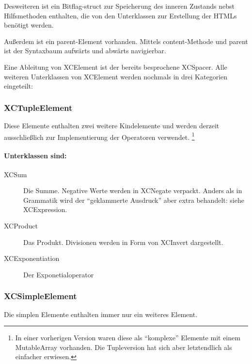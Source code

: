 Desweiteren ist ein Bitflag-struct zur Speicherung des inneren Zustands nebst Hilfsmethoden enthalten, die von den Unterklassen zur Erstellung der HTMLs benötigt werden.


Außerdem ist ein parent-Element vorhanden. 
Mittels content-Methode und parent ist der Syntaxbaum aufwärts und abwärts navigierbar.

Eine Ableitung von XCElement ist der bereits besprochene XCSpacer.
Alle weiteren Unterklassen von XCElement werden nochmals in drei Kategorien eingeteilt:

\subsubsection{XCTupleElement}
Diese Elemente enthalten zwei weitere Kindelemente und werden derzeit ausschließlich zur Implementierung der Operatoren verwendet.
\footnote{
	In einer vorherigen Version waren diese als ``komplexe'' Elemente mit einem MutableArray vorhanden. Die Tupleversion hat sich aber letztendlich als einfacher erwiesen.
}

\paragraph{Unterklassen sind:} 
\begin{description}
	\item[XCSum] Die Summe. Negative Werte werden in XCNegate verpackt.
		Anders als in Grammatik wird der ``geklammerte Ausdruck'' aber extra behandelt: siehe XCExpression.
	\item[XCProduct] Das Produkt. Divisionen werden in Form von XCInvert dargestellt.
	\item[XCExponentiation] Der Exponetialoperator
\end{description}

\subsubsection{XCSimpleElement}
Die simplen Elemente enthalten immer nur ein weiteres Element.
